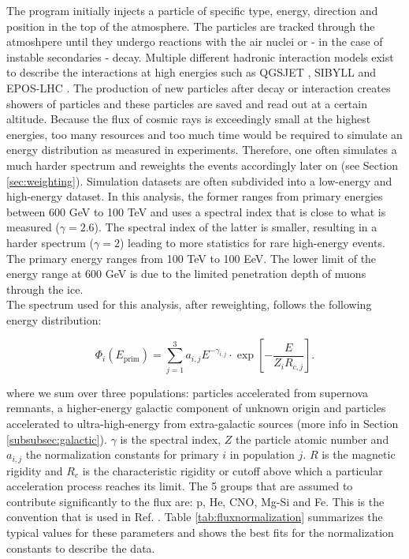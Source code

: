 \noindent The program initially injects a particle of specific type, energy, direction and position in the top of the atmosphere. The particles are tracked through the atmoshpere until they undergo reactions with the air nuclei or - in the case of instable secondaries - decay. Multiple different hadronic interaction models exist to describe the interactions at high energies such as QGSJET \cite{Ostapchenko:2010vb}, SIBYLL \cite{Riehn:2017mfm} and EPOS-LHC \cite{Pierog:2013ria}. The production of new particles after decay or interaction creates showers of particles and these particles are saved and read out at a certain altitude. Because the flux of cosmic rays is exceedingly small at the highest energies, too many resources and too much time would be required to simulate an energy distribution as measured in experiments. Therefore, one often simulates a much harder spectrum and reweights the events accordingly later on (see Section \ref{sec:weighting}). Simulation datasets are often subdivided into a low-energy and high-energy dataset. In this analysis, the former ranges from primary energies between 600 GeV to 100 TeV and uses a spectral index that is close to what is measured ($\gamma = 2.6$). The spectral index of the latter is smaller, resulting in a harder spectrum ($\gamma = 2$) leading to more statistics for rare high-energy events. The primary energy ranges from 100 TeV to 100 EeV. The lower limit of the energy range at 600 GeV is due to the limited penetration depth of muons through the ice.\\

\noindent The spectrum used for this analysis, after reweighting, follows the following energy distribution:

\begin{equation}
\label{eq:gaisser}
\Phi_i \left(E_{\textrm{prim}}\right) = \sum^3_{j=1} a_{i,j} E^{-\gamma_{i,j}} \cdot \exp \left[- \frac{E}{Z_i R_{c,j}}\right].
\end{equation}

\noindent where we sum over three populations: particles accelerated from supernova remnants, a higher-energy galactic component of unknown origin and particles accelerated to ultra-high-energy from extra-galactic sources (more info in Section \ref{subsubsec:galactic}). $\gamma$ is the spectral index, $Z$ the particle atomic number and $a_{i,j}$ the normalization constants for primary $i$ in population $j$. $R$ is the magnetic rigidity and $R_c$ is the characteristic rigidity or cutoff above which a particular acceleration process reaches its limit. The 5 groups that are assumed to contribute significantly to the flux are: p, He, CNO, Mg-Si and Fe. This is the convention that is used in Ref. \cite{Gaisser:2013bla}. Table \ref{tab:fluxnormalization} summarizes the typical values for these parameters and shows the best fits for the normalization constants to describe the data.

